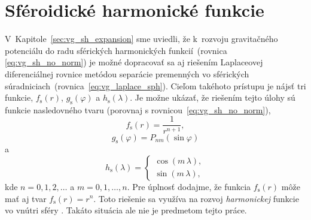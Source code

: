 \documentclass[a4paper,12pt]{book}
\begin{document}
\section{Sféroidické harmonické funkcie}
\label{sec:spheroidal_harmonics}

V~Kapitole~\ref{sec:vg_sh_expansion} sme uviedli, že k~rozvoju gravitačného 
potenciálu do radu sférických harmonických funkcií~(rovnica 
\ref{eq:vg_sh_no_norm}) je možné dopracovať sa aj riešením Laplaceovej 
diferenciálnej rovnice metódou separácie premenných vo sférických 
súradniciach~(rovnica~\ref{eq:vg_laplace_sph}).  Cieľom takéhoto prístupu je 
nájsť tri funkcie, $f_{\mathrm{s}}(r)$, $g_{\mathrm{s}}(\varphi)$ 
a $h_{\mathrm{s}}(\lambda)$.  Je možne ukázať, že riešením tejto úlohy sú 
funkcie nasledovného tvaru (porovnaj s rovnicou~\ref{eq:vg_sh_no_norm}),
%
\begin{equation}
\label{eq:fr}
f_{\mathrm{s}}(r) =
\dfrac{1}{r^{n + 1}}{,}
\end{equation}
%
\begin{equation}
\label{eq:gs}
g_{\mathrm{s}}(\varphi) = P_{nm}(\sin\varphi)
\end{equation}
%
a
%
\begin{equation}
h_{\mathrm{s}}(\lambda) =
%
\begin{cases}
\cos(m\,\lambda){,}\\
\sin(m\,\lambda){,}
\end{cases}
\end{equation}
%
kde $n = 0, 1, 2, \dots$ a $m = 0, 1, \dots, n$.  Pre úplnosť dodajme, že 
funkcia $f_{\mathrm{s}}(r)$ môže mať aj tvar $f_{\mathrm{s}}(r) = r^n$.  Toto 
riešenie sa využíva na rozvoj \emph{harmonickej} funkcie vo vnútri sféry 
\parencite{MoritzPhysicalGeodesy}.  Takáto situácia ale nie je predmetom tejto 
práce.
\end{document}
